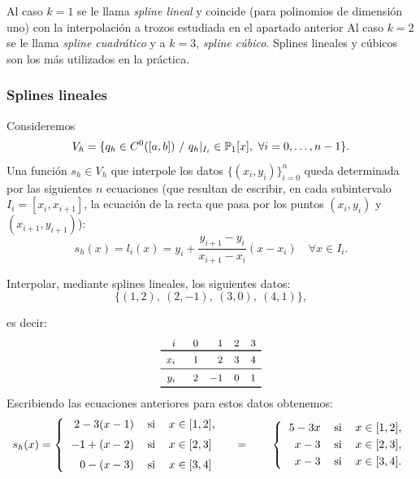 Al caso $k=1$ se le llama \textit{spline lineal} y coincide (para
polinomios de dimensión uno) con la interpolación a trozos estudiada
en el apartado anterior Al caso $k=2$ se le llama \textit{spline
  cuadrático} y a $k=3$, \textit{spline cúbico}. Splines lineales y
cúbicos son los más utilizados en la práctica.

\subsubsection{Splines lineales}
\label{sec:splines-lineales}

Consideremos
\begin{equation*}
  V_h = \{q_h \in C^{0}([a,b])\ / \ q_h|_{I_i}\in  \operatorname{{\mathbb P}}_1[x],\ \forall i=0,\dots,n-1\}.
\end{equation*}
Una función $s_h\in V_h$ que interpole los datos
$\{(x_i,y_i)\}_{i=0}^n$ queda determinada por las siguientes $n$
ecuaciones (que resultan de escribir, en cada subintervalo $I_i=[x_i,
x_{i+1}]$, la ecuación de la recta que pasa por los puntos
$(x_i,y_i)$ y $(x_{i+1},y_{i+1})$):
\begin{equation*}
  \label{eq:splines-lineales-1}
  s_h(x) = l_i(x) = y_i + \frac{y_{i+1}-y_i}{x_{i+1}-x_i}(x-x_i) \quad
  \forall x\in I_i.
\end{equation*}

\begin{example}
  \label{ex:splines-lineales-1}
  Interpolar, mediante splines lineales, los siguientes
  datos:
  \begin{equation*}
    \{ (1,2),\ (2,-1),\ (3,0),\ (4,1) \},
  \end{equation*}
\end{example}
es decir:
\begin{equation}
  \small
  \begin{array}{r@{\rule{4ex}{0pt}}rrrcr}
    i & 0 & 1 & 2 & 3
    \\ \toprule %
    x_i & 1 & 2 & 3 & 4
    \\ \midrule
    y_i & 2 & -1 & 0  & 1
    \\
    \bottomrule
  \end{array}
  \label{eq:tabla-datos-lagrange-splines}
\end{equation}
Escribiendo las ecuaciones anteriores para estos datos obtenemos:
\begin{equation*}
  s_h(x)=\left\{
    \begin{tabular}{rll}
      $2 -3 (x-1)$ & si & $x\in[1,2]$,
      \\\noalign{\medskip}
      $-1 + (x-2)$ & si & $x\in[2,3]$
      \\\noalign{\medskip}
      $0 - (x-3)$ & si & $x\in[3,4]$
    \end{tabular} \right.
  \quad=\qquad
  \left\{
    \begin{tabular}{rll}
      $5 -3x$ & si & $x\in[1,2]$,
      \\\noalign{\smallskip}
      $x-3$ & si & $x\in[2,3]$,
      \\\noalign{\smallskip}
      $x-3$ & si & $x\in[3,4]$.
    \end{tabular} \right.
\end{equation*}

